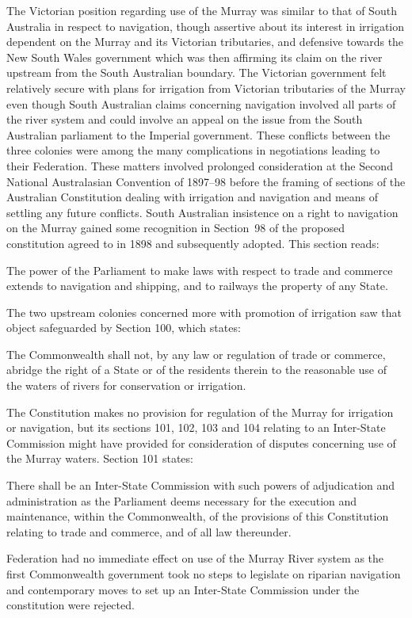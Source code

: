The Victorian position regarding use of the Murray was similar to that
of South Australia in respect to navigation, though assertive about
its interest in irrigation dependent on the Murray and its Victorian
tributaries, and defensive towards the New South Wales government
which was then affirming its claim on the river upstream from the
South Australian boundary.  The Victorian government felt relatively
secure with plans for irrigation from Victorian tributaries of the
Murray even though South Australian claims concerning navigation
involved all parts of the river system and could involve an appeal on
the issue from the South Australian parliament to the Imperial
government.  These conflicts between the three colonies were among the
many complications in negotiations leading to their Federation.  These
matters involved prolonged consideration at the Second National
Australasian Convention of 1897--98 before the framing of sections of
the Australian Constitution  dealing
with irrigation and navigation and means of settling any future
conflicts.  South Australian insistence on a right to navigation
 on the Murray gained some recognition in Section~98
of the proposed constitution agreed to in 1898 and subsequently
adopted.  This section reads:
\begin{Quote}
	The power of the Parliament to make laws with respect to trade
	and commerce extends to navigation and shipping, and to
	railways the property of any
	State.
\end{Quote}

The two upstream colonies concerned more with promotion of irrigation
saw that object safeguarded by Section 100, which states:
\begin{Quote}
	The Commonwealth shall not, by any law or regulation of trade
	or commerce, abridge the right of a State or of the residents
	therein to the reasonable use of the waters of rivers for
	conservation or irrigation.
\end{Quote}

The Constitution makes no provision for regulation of the Murray for
irrigation or navigation, but its sections 101, 102, 103 and 104
relating to an Inter-State Commission might have provided for
consideration of disputes concerning use of the Murray waters.
Section 101 states:
\begin{Quote}
	There shall be an Inter-State Commission with such powers of
	adjudication and administration as the Parliament deems
	necessary for the execution and maintenance, within the
	Commonwealth, of the provisions of this Constitution relating
	to trade and commerce, and of all law thereunder.
\end{Quote}
Federation had no immediate effect on use of the Murray River system
as the first Commonwealth government took no steps to legislate on
riparian navigation and contemporary moves to set up an Inter-State
Commission under the constitution were
rejected.

